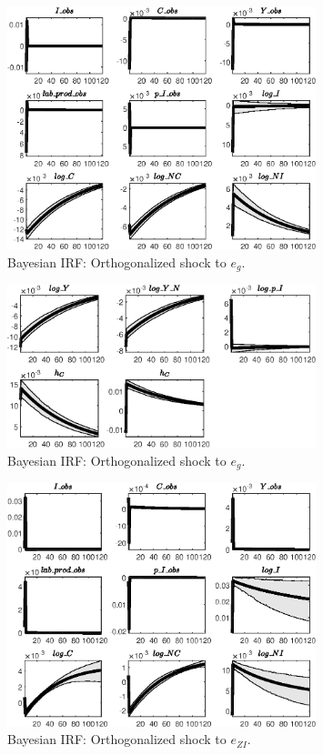  
\begin{figure}[H]
\centering 
\includegraphics[width=0.80\textwidth]{BRS_growth_ext_comovement/Output/BRS_growth_ext_comovement_Bayesian_IRF_e_g_1}
\caption{Bayesian IRF: Orthogonalized shock to ${e_g}$.}
\label{Fig:BayesianIRF:e_g:1}
\end{figure}
 
\begin{figure}[H]
\centering 
\includegraphics[width=0.80\textwidth]{BRS_growth_ext_comovement/Output/BRS_growth_ext_comovement_Bayesian_IRF_e_g_2}
\caption{Bayesian IRF: Orthogonalized shock to ${e_g}$.}
\label{Fig:BayesianIRF:e_g:2}
\end{figure}
 
\begin{figure}[H]
\centering 
\includegraphics[width=0.80\textwidth]{BRS_growth_ext_comovement/Output/BRS_growth_ext_comovement_Bayesian_IRF_e_ZI_1}
\caption{Bayesian IRF: Orthogonalized shock to ${e_{ZI}}$.}
\label{Fig:BayesianIRF:e_ZI:1}
\end{figure}
 

